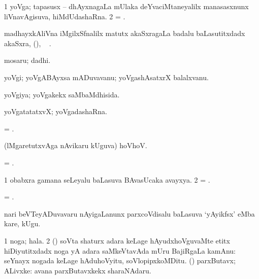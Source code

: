 \bentry
{} 
\gl{\nA} 
\bmng
\bnum
\num{1} yoVga; tapasusx -- dhAyxnagaLa mUlaka deYvaciMtaneyalilx manasasxnunx liVnavAgisuva, hiMdUdashaRna.   
\num{2} = .
\enum
\emng 
\eentry

\bentry
{} 
\gl{\nA} 
\bmng
madhayxkAliVna iMgilxSfnalilx   matutx  akaSxragaLa badalu baLasutitxdadx akaSxra, ({\yoghsymb{}}), \udA\  .
\emng
\eentry

\bentry
{} 
\gl{\nA} 
\bmng
mosaru; dadhi.
\emng
\eentry

\bentry
{} 
\gl{\nA} 
\bmng
yoVgi; yoVgABAyxsa mADuvavanu; yoVgashAsatxrX balalxvanu.
\emng
\eentry

\bentry
{} 
\gl{\gu} 
\bmng
yoVgiya; yoVgakekx saMbaMdhisida.
\emng
\eentry

\bentry
{} 
\gl{\nA}
\bmng
yoVgatatatxvX; yoVgadashaRna.
\emng
\eentry

\bentry
{} 
\gl{\nA} 
\bmng
= .
\emng
\eentry

\bentry
{} 
\gl{\BAavayx} 
\bmng
(lMgaretutxvAga nAvikaru kUguva) hoVhoV.
\emng
\eentry

\bentry
{} 
\gl{\nA} 
\bmng
= .
\emng
\eentry

\bentry
{} 
\gl{\BAavayx} 
\bmng
\bnum
\num{1} obabxra gamana seLeyalu baLasuva BAvasUcaka avayxya. 
\num{2} = .
\enum
\emng
\eentry

\bentry
{} 
\gl{\BAavayx} 
\bmng
= .
\emng
\eentry

\bentry
{} 
\gl{\BAavayx} 
\bmng
nari beVTeyADuvavaru nAyigaLanunx parxcoVdisalu baLasuva `yAyikfsx' eMba kare, kUgu.
\emng
\eentry

\bentry
{} 
\gl{\nA} 
\bmng
\bnum
\num{1} noga; hala. 
\num{2} (\roVca) soVta shaturx adara keLage hAyudxhoVguvaMte etitx hiDiyutitxdadx noga yA adara saMkeVtavAda mUru BajiRgaLa kamAnu:  seYnayx nogada keLage hAduhoVyitu, soVlopipxkoMDitu. 
 (\rUpa) 
\banum
{} parxButavx; ALivxke:  avana parxButavxkekx sharaNAdaru. 


